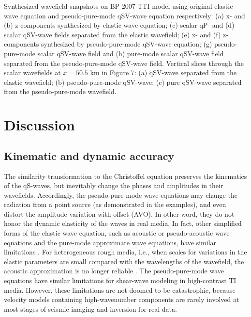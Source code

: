 {
Synthesized wavefield snapshots on BP 2007 TTI model using original elastic wave equation and pseudo-pure-mode 
qSV-wave equation respectively: 
(a) x- and (b) z-components synthesized by elastic wave equation; 
(c) scalar qP- and (d) scalar qSV-wave fields separated from the elastic wavefield; 
(e) x- and (f) z-components synthesized by pseudo-pure-mode qSV-wave equation; 
(g) pseudo-pure-mode scalar qSV-wave field and (h) pure-mode scalar qSV-wave field separated from the pseudo-pure-mode qSV-wave field.
}
{
Vertical slices through the scalar wavefields at $x=50.5$ km in Figure 7: (a) qSV-wave separated from the elastic wavefield;
 (b) pseudo-pure-mode qSV-wave; (c) pure qSV-wave separated from the pseudo-pure-mode wavefield.
}


%
\section{Discussion}

\subsection{Kinematic and dynamic accuracy}
The similarity transformation to the Christoffel equation preserves the kinematics of the qS-waves,
but inevitably change the phases and amplitudes in their wavefields.
Accordingly, the pseudo-pure-mode wave equations may change the radiation from a point source 
(as demonstrated in the examples),
and even distort the amplitude variation with offset (AVO).
In other word, they do not honor the dynamic elasticity of the waves in real media.
In fact, other simplified forms of the elastic wave equation, such as acoustic or pseudo-acoustic wave equations 
and the pure-mode approximate wave equations, have similar limitations
\cite[]{barnes:2009,operto:2009,cheng.kang:2014,shang:2015}.
For heterogeneous rough media, i.e., when scales for variations in the elastic parameters are small compared with the wavelengths
	of the wavefield, the acoustic approximation is no longer reliable \cite[]{cance:2015}.
The pseudo-pure-mode wave equations have similar limitations for shear-wave modeling in high-contrast TI media. 
However, these limitations are not doomed to be catastrophic, because velocity models 
containing high-wavenumber components are rarely involved at most stages of seismic imaging and inversion for real data.

